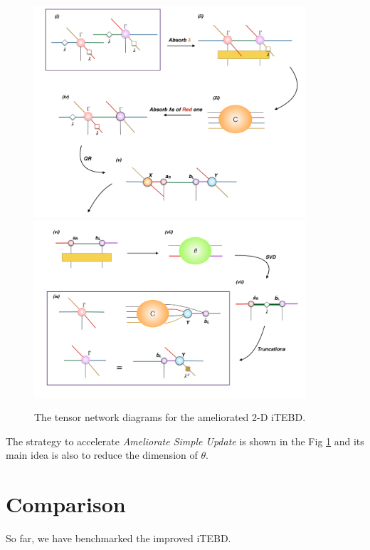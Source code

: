\begin{figure}[ht]
	\centering
	\includegraphics[width=0.90\textwidth]{figures/fig319.png}
	\includegraphics[width=0.90\textwidth]{figures/fig320.png}
	\caption[The tensor network diagrams for the ameliorated 2-D iTEBD with QR decompositiont]{The tensor network diagrams for the ameliorated 2-D iTEBD.}
	\label{fig319}
\end{figure}

The strategy to accelerate \textit{Ameliorate Simple Update} is shown in the Fig \ref{fig319} and its main idea is also to reduce the dimension of $\theta$.

\section{Comparison}

So far, we have benchmarked the improved iTEBD. 

\label{Comparison}
